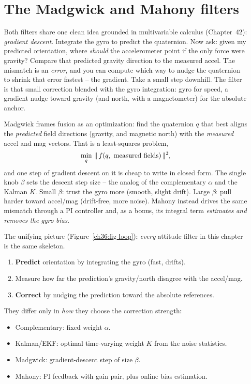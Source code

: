 \section{The Madgwick and Mahony filters}
\label{ch36:madgwick-mahony}

\begin{intuitionbox}
Both filters share one clean idea grounded in multivariable calculus (Chapter~42): \emph{gradient descent}. Integrate the gyro to predict the quaternion.
Now ask: given my predicted orientation, where \emph{should} the accelerometer point if
the only force were gravity? Compare that predicted gravity direction to the measured
accel. The mismatch is an \emph{error}, and you can compute which way to nudge the
quaternion to shrink that error fastest -- the gradient. Take a small step downhill.
The filter is that small correction blended with the gyro integration: gyro for
speed, a gradient nudge toward gravity (and north, with a magnetometer) for the absolute
anchor.
\end{intuitionbox}

\begin{whybox}
Madgwick frames fusion as an optimization: find the quaternion $q$ that best aligns the
\emph{predicted} field directions (gravity, and magnetic north) with the
\emph{measured} accel and mag vectors. That is a least-squares problem,
\[
  \min_q \ \norm{\,f(q,\ \text{measured fields})\,}^2 ,
\]
and one step of gradient descent on it is cheap to write in closed form. The single knob
$\beta$ sets the descent step size -- the analog of the complementary $\alpha$ and the
Kalman $K$. Small $\beta$: trust the gyro more (smooth, slight drift). Large $\beta$:
pull harder toward accel/mag (drift-free, more noise). Mahony instead drives the same
mismatch through a PI controller and, as a bonus, its integral term \emph{estimates and
removes the gyro bias}.
\end{whybox}

\begin{focusbox}
The unifying picture (Figure~\ref{ch36:fig-loop}): \emph{every} attitude filter in this
chapter is the same skeleton.
\begin{enumerate}
  \item \textbf{Predict} orientation by integrating the gyro (fast, drifts).
  \item Measure how far the prediction's gravity/north disagree with the accel/mag.
  \item \textbf{Correct} by nudging the prediction toward the absolute references.
\end{enumerate}
They differ only in \emph{how} they choose the correction strength:
\begin{itemize}
  \item Complementary: fixed weight $\alpha$.
  \item Kalman/EKF: optimal time-varying weight $K$ from the noise statistics.
  \item Madgwick: gradient-descent step of size $\beta$.
  \item Mahony: PI feedback with gain pair, plus online bias estimation.
\end{itemize}
\end{focusbox}

